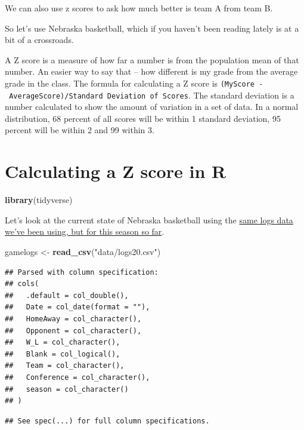\documentclass[]{book}
\newenvironment{Shaded}{\begin{snugshade}}{\end{snugshade}}
\newcommand{\KeywordTok}[1]{\textcolor[rgb]{0.13,0.29,0.53}{\textbf{#1}}}
\newcommand{\NormalTok}[1]{#1}
\newcommand{\StringTok}[1]{\textcolor[rgb]{0.31,0.60,0.02}{#1}}
\begin{document}
We can also use z scores to ask how much better is team A from team B.

So let's use Nebraska basketball, which if you haven't been reading lately is at a bit of a crossroads.

A Z score is a measure of how far a number is from the population mean of that number. An easier way to say that -- how different is my grade from the average grade in the class. The formula for calculating a Z score is \texttt{(MyScore\ -\ AverageScore)/Standard\ Deviation\ of\ Scores}. The standard deviation is a number calculated to show the amount of variation in a set of data. In a normal distribution, 68 percent of all scores will be within 1 standard deviation, 95 percent will be within 2 and 99 within 3.

\hypertarget{calculating-a-z-score-in-r}{%
\section{Calculating a Z score in R}\label{calculating-a-z-score-in-r}}

\begin{Shaded}
\begin{Highlighting}[]
\KeywordTok{library}\NormalTok{(tidyverse)}
\end{Highlighting}
\end{Shaded}

Let's look at the current state of Nebraska basketball using the \href{https://unl.box.com/s/wnlh0u9low1yh56enion8zjmu8r7dc8p}{same logs data we've been using, but for this season so far}.

\begin{Shaded}
\begin{Highlighting}[]
\NormalTok{gamelogs <-}\StringTok{ }\KeywordTok{read_csv}\NormalTok{(}\StringTok{"data/logs20.csv"}\NormalTok{)}
\end{Highlighting}
\end{Shaded}

\begin{verbatim}
## Parsed with column specification:
## cols(
##   .default = col_double(),
##   Date = col_date(format = ""),
##   HomeAway = col_character(),
##   Opponent = col_character(),
##   W_L = col_character(),
##   Blank = col_logical(),
##   Team = col_character(),
##   Conference = col_character(),
##   season = col_character()
## )
\end{verbatim}

\begin{verbatim}
## See spec(...) for full column specifications.
\end{verbatim}
\end{document}
